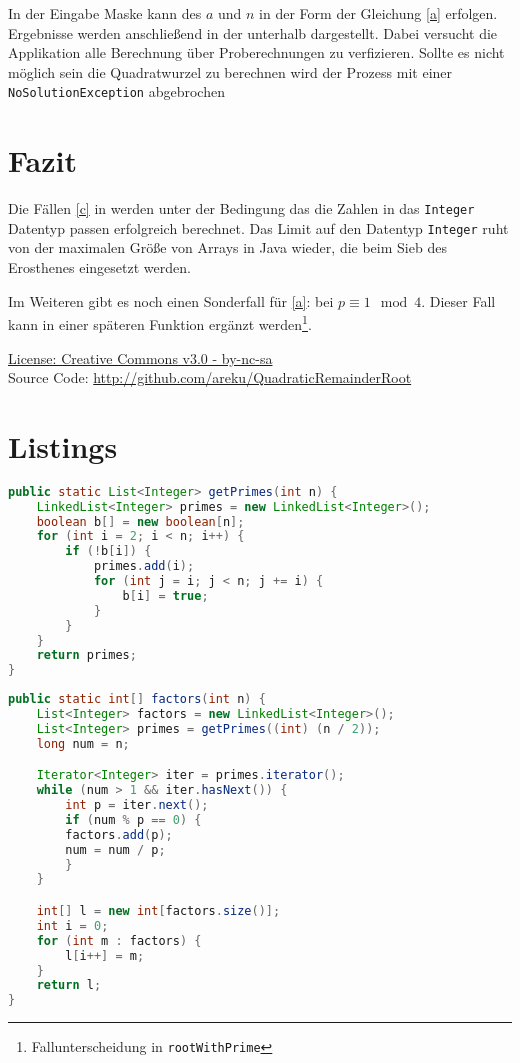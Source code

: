 \documentclass[11pt,a4paper]{scrartcl}
\begin{document}
In der Eingabe Maske kann des $a$ und $n$ in der Form der Gleichung \eqref{a} erfolgen. 
Ergebnisse werden anschließend in der unterhalb dargestellt. Dabei versucht die Applikation 
alle Berechnung über Proberechnungen zu verfizieren. Sollte es nicht möglich sein die Quadratwurzel zu berechnen wird der Prozess mit einer \texttt{NoSolutionException} abgebrochen

\section{Fazit}
Die Fällen \eqref{c} in werden unter der Bedingung das die Zahlen in das \texttt{Integer} Datentyp passen erfolgreich berechnet. Das Limit auf den  Datentyp \texttt{Integer} ruht von der maximalen Größe von Arrays in Java wieder, die beim Sieb des Erosthenes eingesetzt werden. 

Im Weiteren gibt es noch einen Sonderfall für \eqref{a}: bei $p\equiv 1 \mod 4$. Dieser Fall kann in einer späteren Funktion ergänzt werden\footnote{Fallunterscheidung in \texttt{rootWithPrime}}.


\begin{center}
 \href{http://creativecommons.org/licenses/by-nc-sa/3.0/de/legalcode}{	License: Creative Commons v3.0 - by-nc-sa} \\
 Source Code: \url{http://github.com/areku/QuadraticRemainderRoot}
\end{center}

\hrulefill
\section{Listings}

\begin{lstlisting}[language=Java,caption={Sieb des Erosthenes},label=lst:sieb]
public static List<Integer> getPrimes(int n) {
	LinkedList<Integer> primes = new LinkedList<Integer>();
	boolean b[] = new boolean[n];
	for (int i = 2; i < n; i++) {
	    if (!b[i]) {
			primes.add(i);
			for (int j = i; j < n; j += i) {
			    b[i] = true;
			}
		}
	}
	return primes;
}
\end{lstlisting}

\begin{lstlisting}[language=Java,caption={Primfaktorzerlegung},label=lst:faktor]
public static int[] factors(int n) {
	List<Integer> factors = new LinkedList<Integer>();
	List<Integer> primes = getPrimes((int) (n / 2));
	long num = n;

	Iterator<Integer> iter = primes.iterator();
 	while (num > 1 && iter.hasNext()) {
	    int p = iter.next();
	    if (num % p == 0) {
		factors.add(p);
		num = num / p;
	    }
	}

	int[] l = new int[factors.size()];
	int i = 0;
	for (int m : factors) {
	    l[i++] = m;
	}
	return l;
}
\end{lstlisting}
\end{document}
